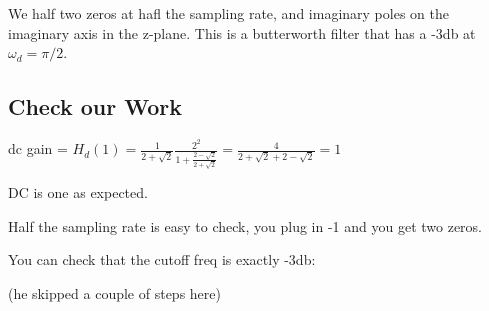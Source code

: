 We half two zeros at hafl the sampling rate, and imaginary poles on the imaginary
axis in the z-plane. This is a butterworth filter that has a -3db at 
$\omega_d  = \pi/2$. 


\subsection*{Check our Work}

dc gain = $H_d(1) = \frac{1}{2 + \sqrt{2}} 
\frac{2^2}{1 +
\frac{2 - \sqrt{2}}{2 + \sqrt{2}}
} =
\frac{4}{2 +\sqrt{2} + 2 - \sqrt{2} } = 1
$

DC is one as expected.

Half the sampling rate is easy to check, you plug in -1 and you get two zeros.

You can check that the cutoff freq is exactly -3db:


(he skipped a couple of steps here)
